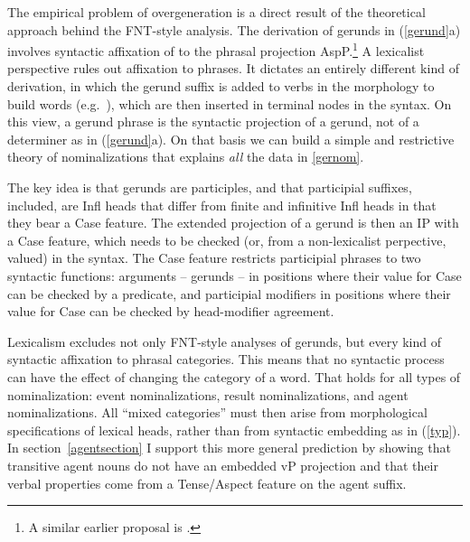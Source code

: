 \documentclass[output=paper,
modfonts
]{LSP/langsci}
\newcommand{\rf}[1]{(\ref{#1})}
\newcommand{\rfa}[2]{(\ref{#1}{#2})}
\begin{document}
The empirical problem of overgeneration is a direct result of the theoretical approach behind
the FNT-style analysis.  The derivation of gerunds in \rfa{gerund}{a} involves syntactic
affixation of  to the phrasal projection AspP.\footnote{A similar earlier proposal
  is \citet{yoon1996}.}  A lexicalist perspective rules out affixation to phrases.  It dictates an
entirely different kind of derivation, in which the gerund suffix  is added to
verbs in the morphology to build words (e.g.\ ), which are then inserted in
terminal nodes in the syntax.  On this view, a gerund phrase is the syntactic projection of a
gerund, not of a determiner as in \rfa{gerund}{a}. On that basis we can build a simple and
restrictive theory of nominalizations that explains \textit{all} the data in \cref{gernom}.

The key idea is that gerunds are participles, and that participial suffixes, 
included, are Infl heads that differ from finite and infinitive Infl heads in that they bear a
Case feature.  The extended projection of a gerund is then an IP with a Case feature, which
needs to be checked (or, from a non-lexicalist perpective, valued) in the syntax.  The Case
feature restricts participial phrases to two syntactic functions:  arguments – gerunds – in
positions where their value for Case can be checked by a predicate, and participial modifiers
in positions where their value for Case can be checked by head-modifier agreement.

Lexicalism excludes not only FNT-style analyses of gerunds, but every kind of syntactic
affixation to phrasal categories.  This means that no syntactic process can have the effect of
changing the category of a word.  That holds for all types of nominalization:  event
nominalizations, result nominalizations, and agent nominalizations.
All ``mixed categories'' must then arise from morphological specifications of lexical heads,
rather than from syntactic embedding as in \rf{typ}.  In section~\ref{agentsection} I support
this more general prediction by showing that transitive agent nouns do not have an embedded vP
projection and that their verbal properties come from a Tense/Aspect feature on the agent
suffix.
\end{document}
